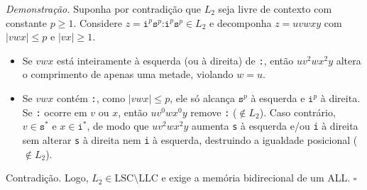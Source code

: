 \textit{Demonstração.} Suponha por contradição que $L_2$ seja livre de contexto com constante $p \ge 1$. Considere $z = \texttt{i}^p\texttt{s}^p\texttt{:}\texttt{i}^p\texttt{s}^p \in L_2$ e decomponha $z = uvwxy$ com $|vwx| \le p$ e $|vx| \ge 1$.
\begin{itemize}
    \item Se $vwx$ está inteiramente à esquerda (ou à direita) de \texttt{:}, então $uv^2wx^2y$ altera o comprimento de apenas uma metade, violando $w=u$.
    \item Se $vwx$ contém \texttt{:}, como $|vwx| \le p$, ele só alcança $\texttt{s}^p$ à esquerda e $\texttt{i}^p$ à direita. Se \texttt{:} ocorre em $v$ ou $x$, então $uv^0wx^0y$ remove \texttt{:} ($\notin L_2$). Caso contrário, $v \in \texttt{s}^*$ e $x \in \texttt{i}^*$, de modo que $uv^2wx^2y$ aumenta \texttt{s} à esquerda e/ou \texttt{i} à direita sem alterar \texttt{s} à direita nem \texttt{i} à esquerda, destruindo a igualdade posicional ($\notin L_2$).
\end{itemize}
Contradição. Logo, $L_2 \in \text{LSC} \setminus \text{LLC}$ e exige a memória bidirecional de um ALL. \hfill $\square$
